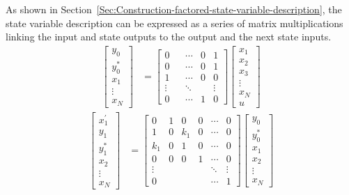 \documentclass[a4paper,twoside,10pt,english]{report}
\begin{document}
As shown in Section~\ref{Sec:Construction-factored-state-variable-description},
the state variable description can be expressed as a series of matrix
multiplications linking the input and state outputs to the output and the next
state inputs.
\begin{align*}
\left[\begin{array}{c}
y_{0}\\
y_{0}^{*}\\
x_{1}\\
\vdots\\
x_{N}
\end{array}\right] & = \left[\begin{array}{ccccc}
0 & & \cdots & 0 & 1 \\
0 & & \cdots & 0 & 1 \\
1 & & \cdots & 0 & 0 \\
\vdots & & \ddots & & \vdots \\
0 & & \cdots & 1 & 0
\end{array}\right]\left[\begin{array}{c}
x_{1}\\
x_{2}\\
x_{3}\\
\vdots\\
x_{N}\\
u                          
\end{array}\right]
\end{align*}
\begin{align*}
\left[\begin{array}{c}
x_{1}^{\prime}\\
y_{1}\\
y_{1}^{*}\\
x_{2}\\
\vdots\\
x_{N}
\end{array}\right] & = \left[\begin{array}{cccccc}
0 & 1 & 0 & 0 & \cdots & 0\\
1 & 0 & k_{1} & 0 & \cdots & 0\\
k_{1} & 0 & 1 & 0 & \cdots & 0\\
0 & 0 & 0 & 1 & \cdots & 0\\
\vdots &  &  & & \ddots & \vdots\\
0 & & & & \cdots & 1
\end{array}\right]\left[\begin{array}{c}
y_{0}\\
y_{0}^{*}\\
x_{1}\\
x_{2}\\
\vdots\\
x_{N}
\end{array}\right]
\end{align*}
\end{document}
